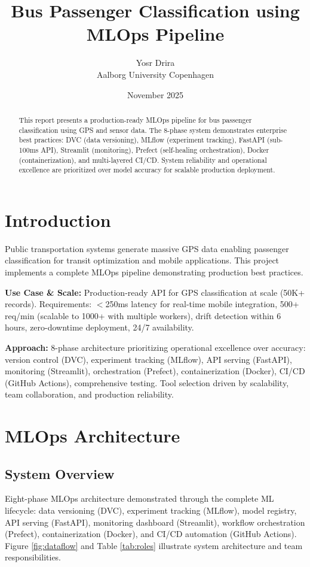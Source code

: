 \documentclass[11pt,a4paper]{article}
\title{\textbf{Bus Passenger Classification using MLOps Pipeline}}
\author{
    Yosr Drira \\
    Aalborg University Copenhagen
}
\date{November 2025}
\begin{document}
\maketitle

\begin{abstract}
\noindent
This report presents a production-ready MLOps pipeline for bus passenger classification using GPS and sensor data. The 8-phase system demonstrates enterprise best practices: DVC (data versioning), MLflow (experiment tracking), FastAPI (sub-100ms API), Streamlit (monitoring), Prefect (self-healing orchestration), Docker (containerization), and multi-layered CI/CD. System reliability and operational excellence are prioritized over model accuracy for scalable production deployment.
\end{abstract}

\section{Introduction}

Public transportation systems generate massive GPS data enabling passenger classification for transit optimization and mobile applications. This project implements a complete MLOps pipeline demonstrating production best practices.

\textbf{Use Case \& Scale:} Production-ready API for GPS classification at scale (50K+ records). Requirements: $<$250ms latency for real-time mobile integration, 500+ req/min (scalable to 1000+ with multiple workers), drift detection within 6 hours, zero-downtime deployment, 24/7 availability.

\textbf{Approach:} 8-phase architecture prioritizing operational excellence over accuracy: version control (DVC), experiment tracking (MLflow), API serving (FastAPI), monitoring (Streamlit), orchestration (Prefect), containerization (Docker), CI/CD (GitHub Actions), comprehensive testing. Tool selection driven by scalability, team collaboration, and production reliability.

\section{MLOps Architecture}

\subsection{System Overview}


Eight-phase MLOps architecture demonstrated through the complete ML lifecycle: data versioning (DVC), experiment tracking (MLflow), model registry, API serving (FastAPI), monitoring dashboard (Streamlit), workflow orchestration (Prefect), containerization (Docker), and CI/CD automation (GitHub Actions). Figure \ref{fig:dataflow} and Table \ref{tab:roles} illustrate system architecture and team responsibilities.
\end{document}
